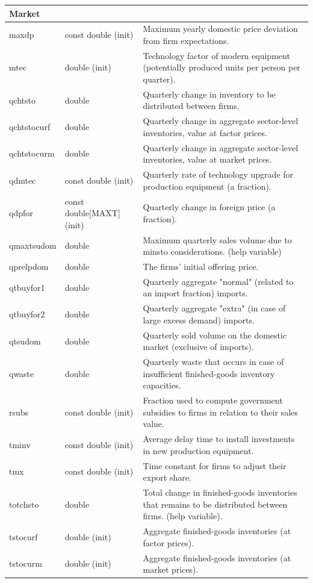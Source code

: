 \documentclass{article}
\begin{document}
\begin{longtable}{p{}p{}p{}}
\multicolumn{3}{l}{\textbf{Market}} \\
\midrule
maxdp & const double (init) & Maximum yearly domestic price deviation from firm expectations.\\
mtec & double (init) & Technology factor of modern equipment (potentially produced units per person per quarter).\\
qchtsto & double & Quarterly change in inventory to be distributed between firms.\\
qchtstocurf & double & Quarterly change in aggregate sector-level inventories, value at factor prices.\\
qchtstocurm & double & Quarterly change in aggregate sector-level inventories, value at market prices.\\
qdmtec & const double (init) & Quarterly rate of technology upgrade for production equipment (a fraction).\\
qdpfor & const double[MAXT] (init) & Quarterly change in foreign price (a fraction).\\
qmaxtsudom & double & Maximum quarterly sales volume due to minsto considerations. (help variable)\\
qprelpdom & double & The firms' initial offering price.\\
qtbuyfor1 & double & Quarterly aggregate "normal" (related to an import fraction) imports.\\
qtbuyfor2 & double & Quarterly aggregate "extra" (in case of large excess demand) imports.\\
qtsudom & double & Quarterly sold volume on the domestic market (exclusive of imports).\\
qwaste & double & Quarterly waste that occurs in case of insufficient finished-goods inventory capacities.\\
rsubs & const double (init) & Fraction used to compute government subsidies to firms in relation to their sales value.\\
tminv & const double (init) & Average delay time to install investments in new production equipment.\\
tmx & const double (init) & Time constant for firms to adjust their export share.\\
totchsto & double & Total change in finished-goods inventories that remains to be distributed between firms. (help variable).\\
tstocurf & double (init) & Aggregate finished-goods inventories (at factor prices).\\
tstocurm & double (init) & Aggregate finished-goods inventories (at market prices).\\
\midrule


\end{longtable}
\end{document}
